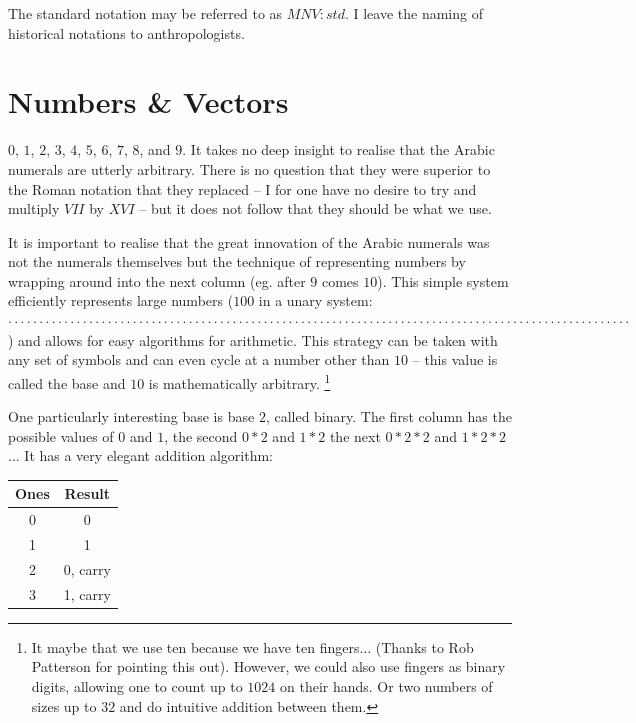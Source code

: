 The standard notation may be referred to as $MNV\!:\!std$. I leave the naming of historical notations to anthropologists.


\section{Numbers \& Vectors}

$0$, $1$, $2$, $3$, $4$, $5$, $6$, $7$, $8$, and $9$. It takes no deep insight to realise that the Arabic numerals are utterly arbitrary. There is no question that they were superior to the Roman notation that they replaced -- I for one have no desire to try and multiply $VII$ by $XVI$ -- but it does not follow that they should be what we use.

It is important to realise that the great innovation of the Arabic numerals was not the numerals themselves but the technique of representing numbers by wrapping around into the next column (eg. after $9$ comes $10$). This simple system efficiently represents large numbers ($100$ in a unary system: $\cdot\cdot\cdot\cdot\cdot\cdot\cdot\cdot\cdot\cdot\cdot\cdot\cdot\cdot\cdot\cdot\cdot\cdot\cdot\cdot\cdot\cdot\cdot\cdot\cdot\cdot\cdot\cdot\cdot\cdot\cdot\cdot\cdot\cdot\cdot\cdot\cdot\cdot\cdot\cdot\cdot\cdot\cdot\cdot\cdot\cdot\cdot\cdot\cdot\cdot\cdot\cdot\cdot\cdot\cdot\cdot\cdot\cdot\cdot\cdot\cdot\cdot\cdot\cdot\cdot\cdot\cdot\cdot\cdot\cdot\cdot\cdot\cdot\cdot\cdot\cdot\cdot\cdot\cdot\cdot\cdot\cdot\cdot\cdot\cdot\cdot\cdot\cdot\cdot\cdot\cdot\cdot\cdot\cdot\cdot\cdot\cdot\cdot\cdot\cdot$) and allows for easy algorithms for arithmetic. This strategy can be taken with any set of symbols and can even cycle at a number other than $10$ -- this value is called the base and $10$ is mathematically arbitrary. \footnote{It maybe that we use ten because we have ten fingers... (Thanks to Rob Patterson for pointing this out). However, we could also use fingers as binary digits, allowing one to count up to $1024$ on their hands. Or two numbers of sizes up to $32$ and do intuitive addition between them.}

One particularly interesting base is base $2$, called binary. The first column has the possible values of $0$ and $1$, the second $0*2$ and $1*2$ the next $0*2*2$ and $1*2*2$... It has a very elegant addition algorithm: \\

\begin{center}
\begin{tabular}{|c|c|} \hline
Ones & Result\\ \hline
0& 0\\ \hline
1& 1\\ \hline
2& 0, carry\\ \hline
3& 1, carry\\ \hline
\end{tabular}
\end{center}

